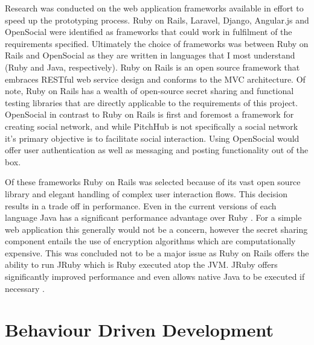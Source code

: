 Research was conducted on the web application frameworks available in effort to speed up the prototyping process. Ruby on Rails, Laravel, Django, Angular.js and OpenSocial were identified as frameworks that could work in fulfilment of the requirements specified. Ultimately the choice of frameworks was between Ruby on Rails and OpenSocial as they are written in languages that I most understand (Ruby and Java, respectively). Ruby on Rails is an open source framework that embraces RESTful web service design and conforms to the MVC architecture. Of note, Ruby on Rails has a wealth of open-source secret sharing and functional testing libraries that are directly applicable to the requirements of this project. OpenSocial in contrast to Ruby on Rails is first and foremost a framework for creating social network, and while PitchHub is not specifically a social network it's primary objective is to facilitate social interaction. Using OpenSocial would offer user authentication as well as messaging and posting functionality out of the box. 
\par
Of these frameworks Ruby on Rails was selected because of its vast open source library and elegant handling of complex user interaction flows. This decision results in a trade off in performance. Even in the current versions of each language Java has a significant  performance advantage over Ruby \cite{Perfo1:online}. For a simple web application this generally would not be a concern, however the secret sharing component entails the use of encryption algorithms which are computationally expensive. This was concluded not to be a major issue as Ruby on Rails offers the ability to run JRuby which is Ruby executed atop the JVM. JRuby offers significantly improved performance and even allows native Java to be executed if necessary \cite{Jruby:online}.


\section{Behaviour Driven Development}

